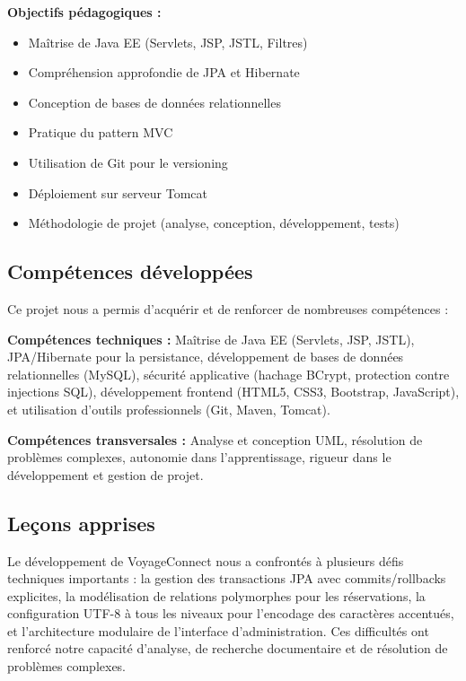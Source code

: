 \documentclass[12pt,a4paper]{report}
\begin{document}
\textbf{Objectifs pédagogiques :}
\begin{itemize}
    \item [OK] Maîtrise de Java EE (Servlets, JSP, JSTL, Filtres)
    \item [OK] Compréhension approfondie de JPA et Hibernate
    \item [OK] Conception de bases de données relationnelles
    \item [OK] Pratique du pattern MVC
    \item [OK] Utilisation de Git pour le versioning
    \item [OK] Déploiement sur serveur Tomcat
    \item [OK] Méthodologie de projet (analyse, conception, développement, tests)
\end{itemize}

\subsection*{Compétences développées}

Ce projet nous a permis d'acquérir et de renforcer de nombreuses compétences :

\textbf{Compétences techniques :} Maîtrise de Java EE (Servlets, JSP, JSTL), JPA/Hibernate pour la persistance, développement de bases de données relationnelles (MySQL), sécurité applicative (hachage BCrypt, protection contre injections SQL), développement frontend (HTML5, CSS3, Bootstrap, JavaScript), et utilisation d'outils professionnels (Git, Maven, Tomcat).

\textbf{Compétences transversales :} Analyse et conception UML, résolution de problèmes complexes, autonomie dans l'apprentissage, rigueur dans le développement et gestion de projet.

\subsection*{Leçons apprises}

Le développement de VoyageConnect nous a confrontés à plusieurs défis techniques importants : la gestion des transactions JPA avec commits/rollbacks explicites, la modélisation de relations polymorphes pour les réservations, la configuration UTF-8 à tous les niveaux pour l'encodage des caractères accentués, et l'architecture modulaire de l'interface d'administration. Ces difficultés ont renforcé notre capacité d'analyse, de recherche documentaire et de résolution de problèmes complexes.
\end{document}
